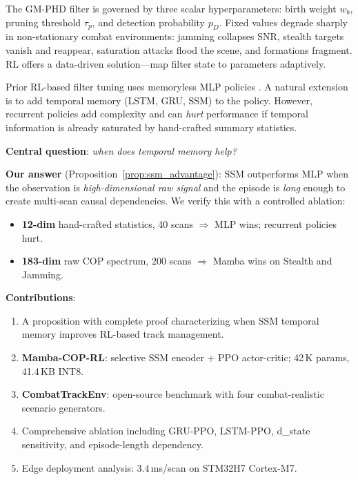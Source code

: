 \documentclass[journal]{IEEEtran}
\begin{document}
The GM-PHD filter is governed by three scalar hyperparameters:
birth weight $w_b$, pruning threshold $\tau_p$, and detection
probability $p_D$.
Fixed values degrade sharply in non-stationary combat environments:
jamming collapses SNR, stealth targets vanish and reappear, saturation
attacks flood the scene, and formations fragment.
RL offers a data-driven solution---map filter state to parameters
adaptively.

Prior RL-based filter tuning uses memoryless MLP
policies \cite{rosello2018marlmot,stephan2022scene}.
A natural extension is to add temporal memory (LSTM, GRU, SSM) to
the policy.
However, recurrent policies add complexity and can \emph{hurt}
performance if temporal information is already saturated by
hand-crafted summary statistics.

\textbf{Central question}: \emph{when does temporal memory help?}

\textbf{Our answer} (Proposition~\ref{prop:ssm_advantage}):
SSM outperforms MLP when the observation is
\emph{high-dimensional raw signal} and the episode is \emph{long}
enough to create multi-scan causal dependencies.
We verify this with a controlled ablation:
\begin{itemize}
  \item \textbf{12-dim} hand-crafted statistics, 40 scans
        $\Rightarrow$ MLP wins; recurrent policies hurt.
  \item \textbf{183-dim} raw COP spectrum, 200 scans
        $\Rightarrow$ Mamba wins on Stealth and Jamming.
\end{itemize}

\textbf{Contributions}:
\begin{enumerate}
  \item A proposition with complete proof characterizing when SSM
    temporal memory improves RL-based track management.
  \item \textbf{Mamba-COP-RL}: selective SSM encoder + PPO
    actor-critic; 42\,K params, 41.4\,KB INT8.
  \item \textbf{CombatTrackEnv}: open-source benchmark with four
    combat-realistic scenario generators.
  \item Comprehensive ablation including GRU-PPO, LSTM-PPO,
    d\_state sensitivity, and episode-length dependency.
  \item Edge deployment analysis: $3.4$\,ms/scan on STM32H7 Cortex-M7.
\end{enumerate}


\end{document}
